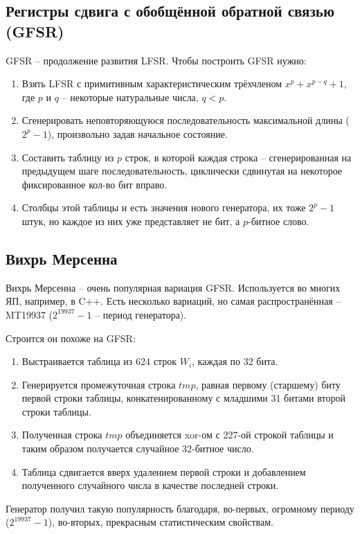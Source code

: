 \subsection{Регистры сдвига с обобщённой обратной связью (GFSR)}

GFSR -- продолжение развития LFSR. Чтобы построить GFSR нужно:

\begin{enumerate}
	\item Взять LFSR с примитивным характеристическим трёхчленом $x^p + x^{p - q} + 1$, где $p$ и $q$ -- некоторые натуральные числа, $q < p$.
	\item Сгенерировать неповторяющуюся последовательность максимальной длины ($2^p - 1$), произвольно задав начальное состояние. 
	\item Составить таблицу из $p$ строк, в которой каждая строка -- сгенерированная на предыдущем шаге последовательность, циклически сдвинутая на некоторое фиксированное кол-во бит вправо. 
	\item Столбцы этой таблицы и есть значения нового генератора, их тоже $2^p - 1$ штук, но каждое из них уже представляет не бит, а $p$-битное слово.
\end{enumerate}

\subsection{Вихрь Мерсенна}

Вихрь Мерсенна -- очень популярная вариация GFSR. Используется во многих ЯП, например, в C++. Есть несколько вариаций, но самая распространённая -- MT19937 ($2^{19937} - 1$ -- период генератора).

Строится он похоже на GFSR:

\begin{enumerate}
	\item Выстраивается таблица из 624 строк $W_i$, каждая по 32 бита.
	\item Генерируется промежуточная строка $tmp$, равная первому (старшему) биту первой строки таблицы, конкатенированному с младшими 31 битами второй строки таблицы.
	\item Полученная строка $tmp$ объединяется xor-ом с 227-ой строкой таблицы и таким образом получается случайное 32-битное число. 
	\item Таблица сдвигается вверх удалением первой строки и добавлением полученного случайного числа в качестве последней строки.
\end{enumerate}

Генератор получил такую популярность благодаря, во-первых, огромному периоду ($2^{19937} - 1$), во-вторых, прекрасным статистическим свойствам.
